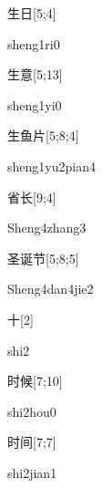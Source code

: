 \begin{verbete}[sheng1ri0]{生日}[5;4]
\begin{pronuncia}{sheng1ri0}
\end{pronuncia}
\end{verbete}

\begin{verbete}[sheng1yi0]{生意}[5;13]
\begin{pronuncia}{sheng1yi0}
\end{pronuncia}
\end{verbete}

\begin{verbete}{生鱼片}[5;8;4]
\begin{pronuncia}{sheng1yu2pian4}
\end{pronuncia}
\end{verbete}

\begin{verbete}{省长}[9;4]
\begin{pronuncia}{Sheng4zhang3}
\end{pronuncia}
\end{verbete}

\begin{verbete}{圣诞节}[5;8;5]
\begin{pronuncia}{Sheng4dan4jie2}
\end{pronuncia}
\end{verbete}

\begin{verbete}[shi2]{十}[2]
\begin{pronuncia}{shi2}
\end{pronuncia}
\end{verbete}

\begin{verbete}{时候}[7;10]
\begin{pronuncia}{shi2hou0}
\end{pronuncia}
\end{verbete}

\begin{verbete}{时间}[7;7]
\begin{pronuncia}{shi2jian1}
\end{pronuncia}
\end{verbete}

